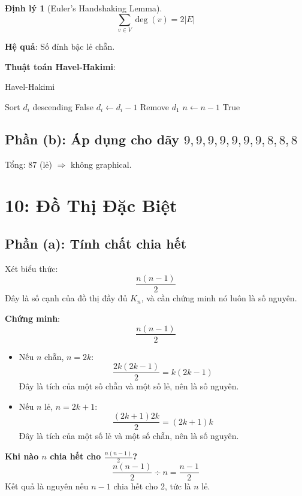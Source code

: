 \documentclass[a4paper,12pt]{article}
\theoremstyle{plain}
\newtheorem{theorem}{Định lý}
\theoremstyle{definition}
\begin{document}
\begin{theorem}[Euler's Handshaking Lemma]
\[
\sum_{v \in V} \deg(v) = 2|E|
\]
\end{theorem}

\textbf{Hệ quả}: Số đỉnh bậc lẻ chẵn.

\textbf{Thuật toán Havel-Hakimi}:
\begin{algorithm}
\caption{Havel-Hakimi}
\begin{algorithmic}
        \State Sort $d_i$ descending
         \Return False
        \EndIf
            \State $d_i \gets d_i - 1$
        \EndFor
        \State Remove $d_1$
        \State $n \gets n-1$
    \EndWhile
    \State \Return True
\EndFunction
\end{algorithmic}
\end{algorithm}

\subsection*{Phần (b): Áp dụng cho dãy \( 9,9,9,9,9,9,9,8,8,8 \)}
Tổng: \( 87 \) (lẻ) \(\Rightarrow\) không graphical.

\section*{10: Đồ Thị Đặc Biệt}

\subsection*{Phần (a): Tính chất chia hết}

Xét biểu thức:
\[
\frac{n(n-1)}{2}
\]
Đây là số cạnh của đồ thị đầy đủ \( K_n \), và cần chứng minh nó luôn là số nguyên.

\textbf{Chứng minh}:
\[
\frac{n(n-1)}{2}
\]
\begin{itemize}
    \item Nếu \( n \) chẵn, \( n = 2k \):
    \[
    \frac{2k(2k-1)}{2} = k(2k-1)
    \]
    Đây là tích của một số chẵn và một số lẻ, nên là số nguyên.
    \item Nếu \( n \) lẻ, \( n = 2k+1 \):
    \[
    \frac{(2k+1)2k}{2} = (2k+1)k
    \]
    Đây là tích của một số lẻ và một số chẵn, nên là số nguyên.
\end{itemize}

\textbf{Khi nào \( n \) chia hết cho \( \frac{n(n-1)}{2} \)?}
\[
\frac{n(n-1)}{2} \div n = \frac{n-1}{2}
\]
Kết quả là nguyên nếu \( n-1 \) chia hết cho 2, tức là \( n \) lẻ.
\end{document}
